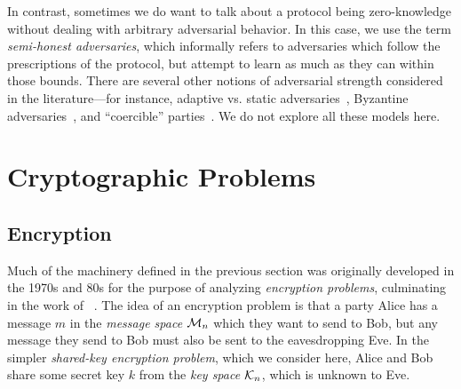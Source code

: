 In contrast, sometimes we do want to talk about a protocol being zero-knowledge
without dealing with arbitrary adversarial behavior. In this case, we use the
term \emph{semi-honest adversaries}, which informally refers to adversaries
which follow the prescriptions of the protocol, but attempt to learn as much as
they can within those bounds. There are several other notions of adversarial
strength considered in the literature---for instance, adaptive vs. static
adversaries~\cite{cramer-et-al-1999}, Byzantine
adversaries~\cite{lindell-et-al-2002}, and ``coercible''
parties~\cite{canetti-et-al-2015}. We do not explore all these models here.

\section{Cryptographic Problems}
\label{sec:crypto-problems}

\subsection{Encryption}

Much of the machinery defined in the previous section was originally developed
in the 1970s and 80s for the purpose of analyzing \emph{encryption problems},
culminating in the work of
\citeauthor{goldwasser-micali-1982}~\cite{goldwasser-micali-1982}. The idea of
an encryption problem is that a party Alice has a message $m$ in the
\emph{message space} $\mathcal{M}_n$ which they want to send to Bob, but any message
they send to Bob must also be sent to the eavesdropping Eve. In the simpler
\emph{shared-key encryption problem}, which we consider here, Alice and Bob
share some secret key $k$ from the \emph{key space $\mathcal{K}_n$}, which is unknown to
Eve.


